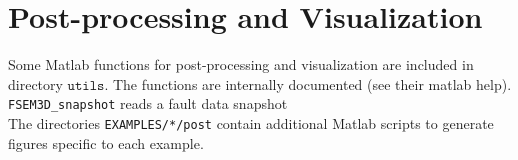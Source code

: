 \section{Post-processing and Visualization}

Some Matlab functions for post-processing and visualization are included
in directory $\mathtt{utils}$. The functions are internally documented
(see their matlab help).\\


\texttt{FSEM3D\_snapshot} reads a fault data snapshot\\

\noindent
The directories \texttt{EXAMPLES/*/post} contain additional Matlab
scripts to generate figures specific to each example.

